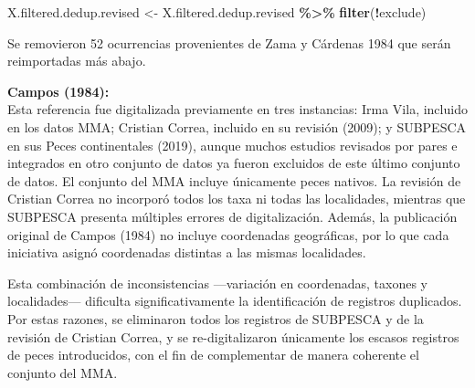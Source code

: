 \documentclass[sn-apa,pdflatex]{sn-jnl}
\newenvironment{Shaded}{\begin{snugshade}}{\end{snugshade}}
\newcommand{\AttributeTok}[1]{\textcolor[rgb]{0.13,0.29,0.53}{#1}}
\newcommand{\CommentTok}[1]{\textcolor[rgb]{0.56,0.35,0.01}{\textit{#1}}}
\newcommand{\ConstantTok}[1]{\textcolor[rgb]{0.56,0.35,0.01}{#1}}
\newcommand{\FunctionTok}[1]{\textcolor[rgb]{0.13,0.29,0.53}{\textbf{#1}}}
\newcommand{\NormalTok}[1]{#1}
\newcommand{\OtherTok}[1]{\textcolor[rgb]{0.56,0.35,0.01}{#1}}
\newcommand{\SpecialCharTok}[1]{\textcolor[rgb]{0.81,0.36,0.00}{\textbf{#1}}}
\newcommand{\StringTok}[1]{\textcolor[rgb]{0.31,0.60,0.02}{#1}}
\begin{document}
\begin{Shaded}
\begin{Highlighting}[]
\NormalTok{X.filtered.dedup.revised }\OtherTok{\textless{}{-}}\NormalTok{ X.filtered.dedup.revised }\SpecialCharTok{\%\textgreater{}\%}
    \FunctionTok{filter}\NormalTok{(}\SpecialCharTok{!}\NormalTok{exclude)}
\end{Highlighting}
\end{Shaded}

Se removieron 52 ocurrencias provenientes de Zama y Cárdenas 1984 que
serán reimportadas más abajo.

\textbf{Campos (1984):}\\
Esta referencia \citep{camposMacrozoobentosFaunaIctica1984} fue
digitalizada previamente en tres instancias: Irma Vila, incluido en los
datos MMA; Cristian Correa, incluido en su revisión (2009); y SUBPESCA
en sus Peces continentales (2019), aunque muchos estudios revisados por
pares e integrados en otro conjunto de datos ya fueron excluidos de este
último conjunto de datos. El conjunto del MMA incluye únicamente peces
nativos. La revisión de Cristian Correa no incorporó todos los taxa ni
todas las localidades, mientras que SUBPESCA presenta múltiples errores
de digitalización. Además, la publicación original de Campos (1984) no
incluye coordenadas geográficas, por lo que cada iniciativa asignó
coordenadas distintas a las mismas localidades.

Esta combinación de inconsistencias ---variación en coordenadas, taxones
y localidades--- dificulta significativamente la identificación de
registros duplicados. Por estas razones, se eliminaron todos los
registros de SUBPESCA y de la revisión de Cristian Correa, y se
re-digitalizaron únicamente los escasos registros de peces introducidos,
con el fin de complementar de manera coherente el conjunto del MMA.

\begin{Shaded}
\end{Shaded}
\end{document}
